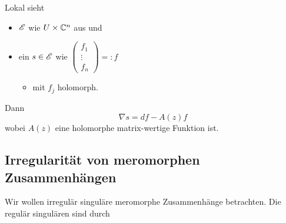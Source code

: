\begin{rem}
  Lokal sieht
  \begin{itemize}
    \item $\mathscr{E}$ wie $U\times\mathbb{C}^n$ aus und
    \item ein $s\in\mathscr{E}$ wie 
      $\begin{pmatrix}f_{1}\\ \vdots\\ f_{n} \end{pmatrix}=:f$
      \begin{itemize}
        \item mit $f_j$ holomorph.
      \end{itemize}
  \end{itemize}
  Dann
  \[
    \nabla s=df - A(z)f
  \]
  wobei $A(z)$ eine holomorphe matrix-wertige Funktion ist.
  \begin{comment}
    Wollen diese Klassifizieren. Klassifiziere diese durch die Lösung von
    $\nabla s=0$. Dies ist eine DGL (ODE).
  \end{comment}
\end{rem}
\begin{comment}
  \TODO[$A^0=\dots$]
  \begin{defn}
    \begin{itemize}
      \item $G\{z\}:=\GL_n(\C\{z\})$ \emph{locale analytischen Gauge
        Tranformationen}
        \begin{itemize}
          \item mit Wirkung $F[A^0]=(dF)F^{-1}+FA^0F^{-1}$
        \end{itemize}
      \item $\hat G:=\GL_n(\C\llbracket z\rrbracket)$ \emph{formale
        Tranformationen}
    \end{itemize}
    definiere
    \[
      \Syst(A^0)
      :=\left\{A \mid A=\hat F[A^0]\text{ für ein }\hat F\in\hat G\right\}
    \]
  \end{defn}
  \begin{center}
    \textbf{Wir sind interessiert in $\Syst(A^0)/\C\{z\}$}
  \end{center}
\end{comment}
\subsection{Irregularität von meromorphen Zusammenhängen} %
Wir wollen irregulär singuläre meromorphe Zusammenhänge betrachten. Die regulär
singulären sind durch \TODO


